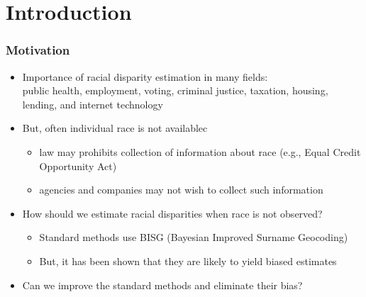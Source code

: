 \documentclass{beamer}
\title[Algorithm-Assisted Human Decision]{\tit}
\institute[Harvard]{\large Harvard University }
\date{Department of Political Science, University of Michigan\\
  March 10, 2023 \\  \vspace{.25in} Joint work with
  Cory McCartan, Jacob Goldin, and Daniel E. Ho }
\author[Kosuke Imai]{\large Kosuke Imai }
\begin{document}
\frame{\titlepage}



\section{Introduction}

\begin{frame}

  \frametitle{Motivation}

  \begin{itemize}
  \item Importance of racial disparity estimation in many fields:\\
    public health, employment, voting, criminal justice, taxation,
    housing, lending, and internet technology

    \vfill
  \item But, often individual race is not availablec
    \begin{itemize}
    \item law may prohibits collection of information about race
      (e.g., Equal Credit Opportunity Act)
    \item agencies and companies may not wish to collect such information
    \end{itemize}
    \vfill
  \item How should we estimate racial disparities when race is not
    observed?
    \begin{itemize}
    \item Standard methods use BISG (Bayesian Improved Surname
      Geocoding)
    \item But, it has been shown that they are likely to yield biased estimates
    \end{itemize}

  \item Can we improve the standard methods and eliminate their bias? 
  \end{itemize}

\end{frame}
\end{document}
